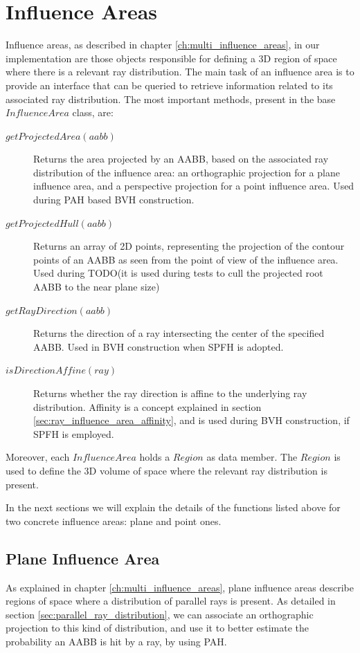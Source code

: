 \documentclass{PoliMi_MasterThesis}
\begin{document}
\section{Influence Areas} \label{sec:influence_areas}
Influence areas, as described in chapter \ref{ch:multi_influence_areas}, in our implementation are those objects responsible for defining a 3D region of space where there is a relevant ray distribution. The main task of an influence area is to provide an interface that can be queried to retrieve information related to its associated ray distribution. The most important methods, present in the base $InfluenceArea$ class, are:
\begin{description}
	\item[\boldmath$getProjectedArea(aabb)$] Returns the area projected by an AABB, based on the associated ray distribution of the influence area: an orthographic projection for a plane influence area, and a perspective projection for a point influence area. Used during PAH based BVH construction.
	\item[\boldmath$getProjectedHull(aabb)$] Returns an array of 2D points, representing the projection of the contour points of an AABB as seen  from the point of view of the influence area. Used during TODO(it is used during tests to cull the projected root AABB to the near plane size)
	\item[\boldmath$getRayDirection(aabb)$] Returns the direction of a ray intersecting the center of the specified AABB. Used in BVH construction when SPFH is adopted.
	\item[\boldmath$isDirectionAffine(ray)$] Returns whether the ray direction is affine to the underlying ray distribution. Affinity is a concept explained in section \ref{sec:ray_influence_area_affinity}, and is used during BVH construction, if SPFH is employed.
\end{description}

Moreover, each $InfluenceArea$ holds a $Region$ as data member. The $Region$ is used to define the 3D volume of space where the relevant ray distribution is present.

In the next sections we will explain the details of the functions listed above for two concrete influence areas: plane and point ones.

\subsection{Plane Influence Area} \label{ssec:plane_influence_area}
As explained in chapter \ref{ch:multi_influence_areas}, plane influence areas describe regions of space where a distribution of parallel rays is present. As detailed in section \ref{sec:parallel_ray_distribution}, we can associate an orthographic projection to this kind of distribution, and use it to better estimate the probability an AABB is hit by a ray, by using PAH.
\end{document}

